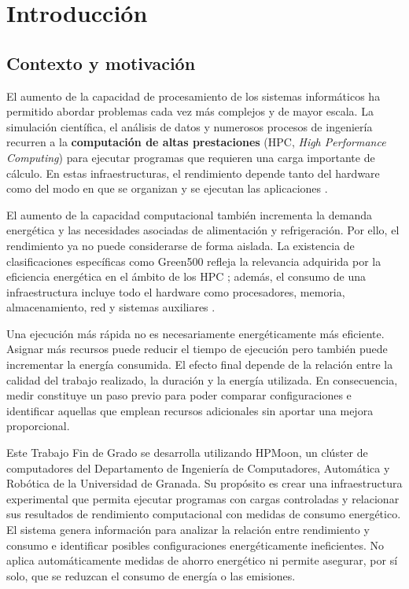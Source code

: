 \chapter{Introducción}
\label{cap:introduccion}

\section{Contexto y motivación}
\label{sec:introduccion_contexto}

El aumento de la capacidad de procesamiento de los sistemas informáticos ha permitido abordar problemas cada vez más complejos y de mayor escala. La simulación científica, el análisis de datos y numerosos procesos de ingeniería recurren a la \textbf{computación de altas prestaciones} (HPC, \emph{High Performance Computing}) para ejecutar programas que requieren una carga importante de cálculo. En estas infraestructuras, el rendimiento depende tanto del hardware como del modo en que se organizan y se ejecutan las aplicaciones \parencite{hager2011}.

El aumento de la capacidad computacional también incrementa la demanda energética y las necesidades asociadas de alimentación y refrigeración. Por ello, el rendimiento ya no puede considerarse de forma aislada. La existencia de clasificaciones específicas como Green500 refleja la relevancia adquirida por la eficiencia energética en el ámbito de los HPC \parencite{green500}; además, el consumo de una infraestructura incluye todo el hardware como procesadores, memoria, almacenamiento, red y sistemas auxiliares \parencite{barroso2018datacenter}.

Una ejecución más rápida no es necesariamente energéticamente más eficiente. Asignar más recursos puede reducir el tiempo de ejecución pero también puede incrementar la energía consumida. El efecto final depende de la relación entre la calidad del trabajo realizado, la duración y la energía utilizada. En consecuencia, medir constituye un paso previo para poder comparar configuraciones e identificar aquellas que emplean recursos adicionales sin aportar una mejora proporcional.

Este Trabajo Fin de Grado se desarrolla utilizando HPMoon, un clúster de computadores del Departamento de Ingeniería de Computadores, Automática y Robótica de la Universidad de Granada. Su propósito es crear una infraestructura experimental que permita ejecutar programas con cargas controladas y relacionar sus resultados de rendimiento computacional con medidas de consumo energético. El sistema genera información para analizar la relación entre rendimiento y consumo e identificar posibles configuraciones energéticamente ineficientes. No aplica automáticamente medidas de ahorro energético ni permite asegurar, por sí solo, que se reduzcan el consumo de energía o las emisiones.

